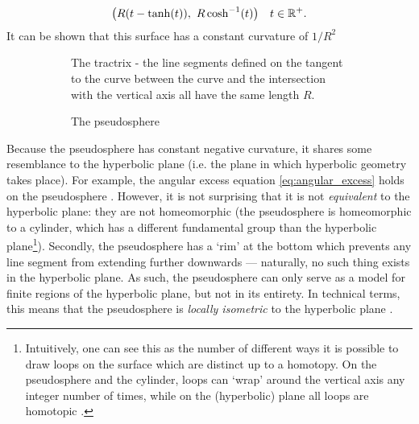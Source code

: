     \[ 
        \qty(R(t - \tanh(t)),\ R\cosh[-1](t)) \quad t \in \mathbb{R}^+.
    \]
It can be shown that this surface has a constant curvature of \(1/R^2\)
\begin{figure}[ht]
    \begin{subfigure}[b]{0.5\textwidth}
        \centering
        
        \caption{The tractrix - the line segments defined on the tangent to the curve between the curve and the intersection with the vertical axis all have the same length \(R\).}
        \label{fig:tractrix}
    \end{subfigure}
    \begin{subfigure}[b]{0.45\textwidth}
        \centering
        
        \caption{The pseudosphere}
        \label{fig:pseudosphere}
    \end{subfigure}
    \caption{}
\end{figure}
Because the pseudosphere has constant negative curvature, it shares some resemblance to the hyperbolic plane (i.e. the plane in which hyperbolic geometry takes place). For example, the angular excess equation \cref{eq:angular_excess} holds on the pseudosphere \cite{Needham1997}. However, it is not surprising that it is not \emph{equivalent} to the hyperbolic plane: they are not homeomorphic (the pseudosphere is homeomorphic to a cylinder, which has a different fundamental group than the hyperbolic plane\footnote{Intuitively, one can see this as the number of different ways it is possible to draw loops on the surface which are distinct up to a homotopy. On the pseudosphere and the cylinder, loops can `wrap' around the vertical axis any integer number of times, while on the (hyperbolic) plane all loops are homotopic \cite{Lee2000}.}). Secondly, the pseudosphere has a `rim' at the bottom which prevents any line segment from extending further downwards --- naturally, no such thing exists in the hyperbolic plane. As such, the pseudosphere can only serve as a model for finite regions of the hyperbolic plane, but not in its entirety. In technical terms, this means that the pseudosphere is \emph{locally isometric} to the hyperbolic plane \cite{Ghys2010}.

